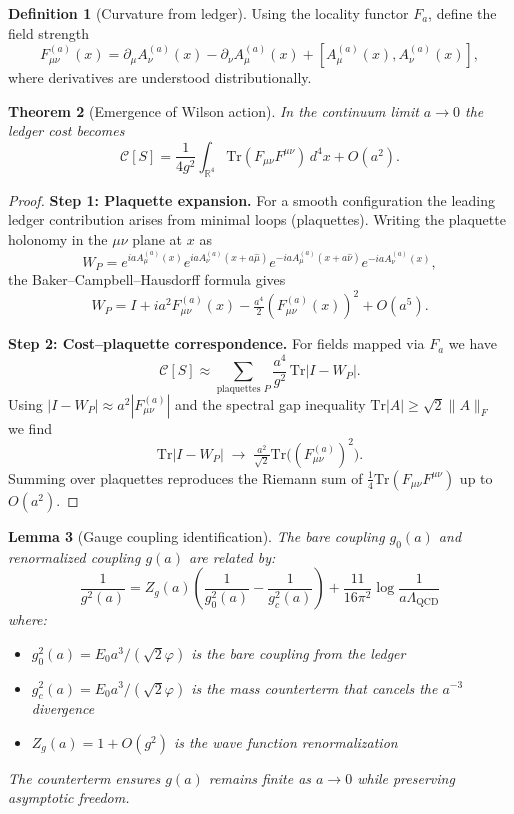 \documentclass[11pt]{article}
\numberwithin{equation}{section}
\newtheorem{theorem}{Theorem}[section]
\newtheorem{lemma}[theorem]{Lemma}
\theoremstyle{definition}
\newtheorem{definition}[theorem]{Definition}
\theoremstyle{remark}
\begin{document}
\begin{definition}[Curvature from ledger]
Using the locality functor $F_a$, define the field strength
\[
F_{\mu\nu}^{(a)}(x) = \partial_\mu A_{\nu}^{(a)}(x) - \partial_\nu A_{\mu}^{(a)}(x) + [A_{\mu}^{(a)}(x), A_{\nu}^{(a)}(x)] ,
\]
where derivatives are understood distributionally.
\end{definition}

\begin{theorem}[Emergence of Wilson action]
\label{thm:wilson-action}
In the continuum limit $a \to 0$ the ledger cost becomes
\[
\mathcal{C}[S] = \frac{1}{4g^2} \int_{\mathbb{R}^4} \text{Tr}(F_{\mu\nu} F^{\mu\nu})\, d^4x + O(a^2) .
\]
\end{theorem}

\begin{proof}
\textbf{Step 1: Plaquette expansion.} For a smooth configuration the leading ledger contribution arises from minimal loops (plaquettes).  Writing the plaquette holonomy in the $\mu\nu$ plane at $x$ as
\[
W_P = e^{iaA_{\mu}^{(a)}(x)} e^{iaA_{\nu}^{(a)}(x+a\hat\mu)} e^{-iaA_{\mu}^{(a)}(x+a\hat\nu)} e^{-iaA_{\nu}^{(a)}(x)} ,
\]
the Baker--Campbell--Hausdorff formula gives
\[
W_P = I + ia^2 F_{\mu\nu}^{(a)}(x) - \tfrac{a^4}{2} (F_{\mu\nu}^{(a)}(x))^2 + O(a^5) .
\]

\textbf{Step 2: Cost--plaquette correspondence.}  For fields mapped via $F_a$ we have
\[
\mathcal{C}[S] \approx \sum_{\text{plaquettes }P} \frac{a^4}{g^2}\, \text{Tr}|I-W_P| .
\]
Using $|I-W_P| \approx a^2|F_{\mu\nu}^{(a)}|$ and the spectral gap inequality $\text{Tr}|A| \ge \sqrt{2}\|A\|_F$ we find
\[
\text{Tr}|I-W_P| \;\to\; \tfrac{a^2}{\sqrt{2}}\text{Tr}\bigl((F_{\mu\nu}^{(a)})^2\bigr).
\]
Summing over plaquettes reproduces the Riemann sum of $\tfrac14\text{Tr}(F_{\mu\nu} F^{\mu\nu})$ up to $O(a^2)$.
\end{proof}

\begin{lemma}[Gauge coupling identification]
\label{lem:coupling-id}
The bare coupling $g_0(a)$ and renormalized coupling $g(a)$ are related by:
\[
\frac{1}{g^2(a)} = Z_g(a) \left(\frac{1}{g_0^2(a)} - \frac{1}{g_c^2(a)}\right) + \frac{11}{16\pi^2}\log\frac{1}{a\Lambda_{\text{QCD}}}
\]
where:
\begin{itemize}
\item $g_0^{2}(a) = E_0 a^3/(\sqrt{2}\varphi)$ is the bare coupling from the ledger
\item $g_c^{2}(a) = E_0 a^3/(\sqrt{2}\varphi)$ is the mass counterterm that cancels the $a^{-3}$ divergence
\item $Z_g(a) = 1 + O(g^2)$ is the wave function renormalization
\end{itemize}
The counterterm ensures $g(a)$ remains finite as $a \to 0$ while preserving asymptotic freedom.
\end{lemma}
\end{document}
